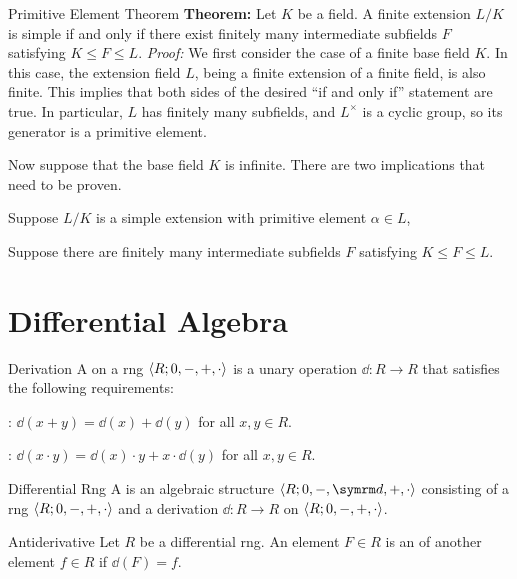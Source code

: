 \documentclass[12pt]{report}
\begin{document}
\begin{thmbox}{Primitive Element Theorem}
	\textbf{Theorem:} Let $K$ be a field. A finite extension $L/K$ is simple if and only if there exist finitely many intermediate subfields $F$ satisfying $K \le F \le L$.
\tcblower
	\textit{Proof:} We first consider the case of a finite base field $K$. In this case, the extension field $L$, being a finite extension of a finite field, is also finite. This implies that both sides of the desired ``if and only if'' statement are true. In particular, $L$ has finitely many subfields, and $L^\times$ is a cyclic group, so its generator is a primitive element.

	Now suppose that the base field $K$ is infinite. There are two implications that need to be proven.
	\begin{dfnitems}
		\item Suppose $L/K$ is a simple extension with primitive element $\alpha \in L$,
		\item Suppose there are finitely many intermediate subfields $F$ satisfying $K \le F \le L$.
	\end{dfnitems}
\end{thmbox}



\chapter{Differential Algebra}

\begin{dfnbox}{Derivation}
	A  on a rng ${\langle {R; 0, -, +, \cdot} \rangle}$ is a unary operation $\dd: R \to R$ that satisfies the following requirements:
	\begin{dfnitems}
		\item {}: $\dd(x + y) = \dd(x) + \dd(y)$ for all $x, y \in R$.
		\item {}: $\dd(x \cdot y) = \dd(x) \cdot y + x \cdot \dd(y)$ for all $x, y \in R$.
	\end{dfnitems}
\end{dfnbox}

\begin{dfnbox}{Differential Rng}
	A  is an algebraic structure $\alg{R; 0, -, \dd, +, \cdot}$ consisting of a rng ${\langle {R; 0, -, +, \cdot} \rangle}$ and a derivation $\dd: R \to R$ on ${\langle {R; 0, -, +, \cdot} \rangle}$.
\end{dfnbox}

\begin{dfnbox}{Antiderivative}
	Let $R$ be a differential rng. An element $F \in R$ is an  of another element $f \in R$ if $\dd(F) = f$.
\end{dfnbox}
\end{document}
